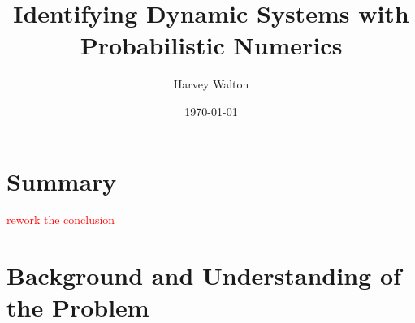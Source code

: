 \documentclass[12pt]{article}
\title{Identifying Dynamic Systems with Probabilistic Numerics}
\author{Harvey Walton}
\date{\today}
\begin{document}

    \thispagestyle{empty}
    

    \section{Summary}
    \textcolor{red}{rework the conclusion}

    \printnomenclature

    \newpage
    \tableofcontents
    \newpage


    \section{Background and Understanding of the Problem}
\end{document}
